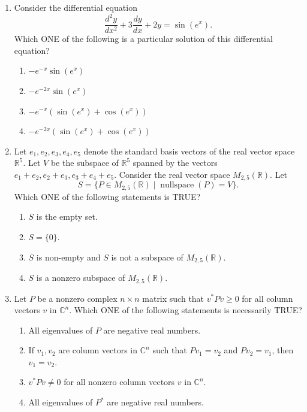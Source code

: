 \begin{enumerate}
\begin{enumerate}[label=(\Alph*)]
\item $\displaystyle 2\int_0^2\int_0^{\sqrt{4-x^2}}(\sqrt{4-x^2-y^2}-1)\,dy\,dx$
\item $\displaystyle 2\int_0^{\sqrt3}\int_0^{\sqrt{3-x^2}}(\sqrt{4-x^2-y^2}-1)\,dy\,dx$
\end{enumerate}
\item Consider the differential equation
\[\frac{d^2y}{dx^2}+3\frac{dy}{dx}+2y=\sin(e^x).\]
Which ONE of the following is a particular solution of this differential equation?
\begin{enumerate}[label=(\Alph*)]
\item $-e^{-x}\sin(e^x)$
\item $-e^{-2x}\sin(e^x)$
\item $-e^{-x}(\sin(e^x)+\cos(e^x))$
\item $-e^{-2x}(\sin(e^x)+\cos(e^x))$
\end{enumerate}
\item Let $e_1,e_2,e_3,e_4,e_5$ denote the standard basis vectors of the real vector space $\mathbb R^5$. Let $V$ be the subspace of $\mathbb R^5$ spanned by the vectors $e_1+e_2,e_2+e_3,e_3+e_4+e_5$. Consider the real vector space $M_{2,5}(\mathbb R)$. Let
\[S=\{P\in M_{2,5}(\mathbb R)\mid\operatorname{nullspace}(P)=V\}.\]
Which ONE of the following statements is TRUE?
\begin{enumerate}[label=(\Alph*)]
\item $S$ is the empty set.
\item $S=\{0\}$.
\item $S$ is non-empty and $S$ is not a subspace of $M_{2,5}(\mathbb R)$.
\item $S$ is a nonzero subspace of $M_{2,5}(\mathbb R)$.
\end{enumerate}
\item Let $P$ be a nonzero complex $n\times n$ matrix such that $v^*Pv\ge0$ for all column vectors $v$ in $\mathbb C^n$. Which ONE of the following statements is necessarily TRUE?
\begin{enumerate}[label=(\Alph*)]
\item All eigenvalues of $P$ are negative real numbers.
\item If $v_1,v_2$ are column vectors in $\mathbb C^n$ such that $Pv_1=v_2$ and $Pv_2=v_1$, then $v_1=v_2$.
\item $v^*Pv\ne0$ for all nonzero column vectors $v$ in $\mathbb C^n$.
\item All eigenvalues of $P^*$ are negative real numbers.
\end{enumerate}

\end{enumerate}
